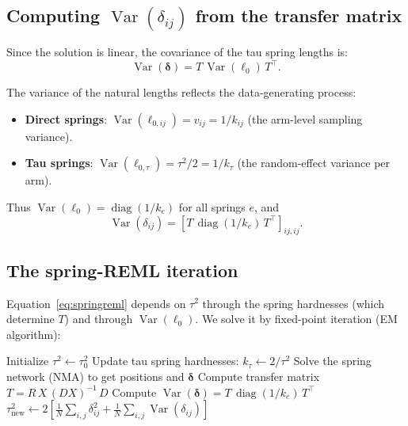 \documentclass[12pt]{article}
\newcommand{\Var}{\operatorname{Var}}
\newcommand{\diag}{\operatorname{diag}}
\begin{document}
\subsection{Computing $\Var(\delta_{ij})$ from the transfer matrix}

Since the solution is linear, the covariance of the tau spring lengths
is:
\begin{equation}\label{eq:vardelta}
  \Var(\boldsymbol{\delta}) = T \, \Var(\boldsymbol{\ell}_0) \, T^\top.
\end{equation}

The variance of the natural lengths reflects the data-generating process:
\begin{itemize}
  \item \textbf{Direct springs}: $\Var(\ell_{0,ij}) = v_{ij} = 1/k_{ij}$
    (the arm-level sampling variance).
  \item \textbf{Tau springs}: $\Var(\ell_{0,\tau}) = \tau^2/2 = 1/k_\tau$
    (the random-effect variance per arm).
\end{itemize}
Thus $\Var(\boldsymbol{\ell}_0) = \diag(1/k_e)$ for all springs $e$,
and
\begin{equation}
  \Var(\delta_{ij}) = [T \, \diag(1/k_e) \, T^\top]_{ij,ij}.
\end{equation}

\subsection{The spring-REML iteration}

Equation~\eqref{eq:springreml} depends on $\tau^2$ through the spring
hardnesses (which determine $T$) and through $\Var(\boldsymbol{\ell}_0)$.
We solve it by fixed-point iteration (EM algorithm):

\begin{algorithm}[H]
\caption{Spring-REML estimator for $\tau^2$}
\begin{algorithmic}[1]
\State Initialize $\tau^2 \leftarrow \tau^2_0$
\Repeat
  \State Update tau spring hardnesses: $k_\tau \leftarrow 2/\tau^2$
  \State Solve the spring network (NMA) to get positions and $\boldsymbol{\delta}$
  \State Compute transfer matrix $T = R \, X \, (DX)^{-1} \, D$
  \State Compute $\Var(\boldsymbol{\delta}) = T \, \diag(1/k_e) \, T^\top$
  \State $\tau^2_{\text{new}} \leftarrow 2 \left[
    \frac{1}{N} \sum_{i,j} \delta_{ij}^2
    + \frac{1}{N} \sum_{i,j} \Var(\delta_{ij})
    \right]$
\end{algorithmic}
\end{algorithm}
\end{document}
